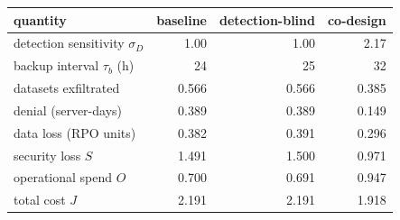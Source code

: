 \begin{tabular}{@{}lrrr@{}}
\toprule
quantity & baseline & detection-blind & co-design\\
\midrule
detection sensitivity $\sigma_D$ & 1.00 & 1.00 & 2.17\\
backup interval $\tau_b$ (h) & 24 & 25 & 32\\
datasets exfiltrated & 0.566 & 0.566 & 0.385\\
denial (server-days) & 0.389 & 0.389 & 0.149\\
data loss (RPO units) & 0.382 & 0.391 & 0.296\\
\midrule
security loss $S$ & 1.491 & 1.500 & 0.971\\
operational spend $O$ & 0.700 & 0.691 & 0.947\\
total cost $J$ & 2.191 & 2.191 & 1.918\\
\bottomrule
\end{tabular}
